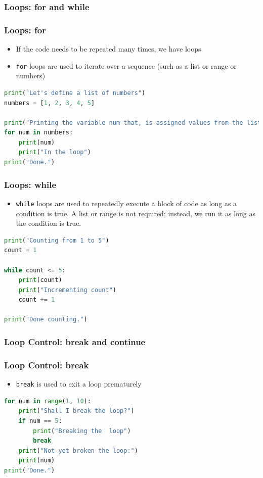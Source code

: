 \documentclass{beamer}
\begin{document}
    \subsubsection{Loops: for and while}
    \begin{frame}[fragile]
        \frametitle{Loops: for}
        \begin{itemize}
            \item If the code needs to be repeated many times, we have loops.
            \item \texttt{for} loops are used to iterate over a sequence (such as a list or range or numbers) 
        \end{itemize}
        \begin{lstlisting}[language=Python]
print("Let's define a list of numbers")
numbers = [1, 2, 3, 4, 5]

print("Printing the variable num that, is assigned values from the list during the loop")
for num in numbers:
    print(num)
    print("In the loop")
print("Done.")
        \end{lstlisting}
    \end{frame}

    \begin{frame}[fragile]
        \frametitle{Loops: while}
        \begin{itemize}
            \item \texttt{while} loops are used to repeatedly execute a block of code as long as a condition is true. A list or range is not required; instead, we run it as long as the condition is true.
        \end{itemize}
        \begin{lstlisting}[language=Python]
print("Counting from 1 to 5")
count = 1

while count <= 5:
    print(count)
    print("Incrementing count")
    count += 1

print("Done counting.")
        \end{lstlisting}
    \end{frame}

    \subsubsection{Loop Control: break and continue}
    \begin{frame}[fragile]
        \frametitle{Loop Control: break}
        \begin{itemize}
            \item \texttt{break} is used to exit a loop prematurely
        \end{itemize}
        \begin{lstlisting}[language=Python]
for num in range(1, 10):
    print("Shall I break the loop?")
    if num == 5:
        print("Breaking the  loop")
        break
    print("Not yet broken the loop:")
    print(num)
print("Done.")
        \end{lstlisting}
    \end{frame}
\end{document}
